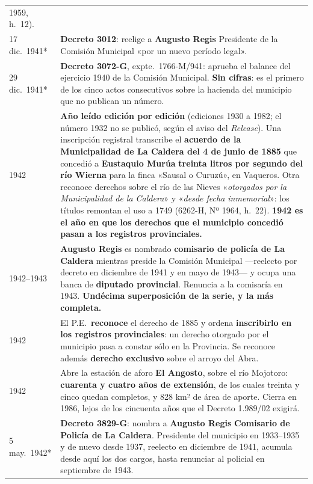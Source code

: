 \begin{longtable}{@{}p{2.7cm}p{10.3cm}@{}}
1959, h.\ 12). \\
17 dic.\ 1941* & \textbf{Decreto 3012}: reelige a \textbf{Augusto Regis}\index{Regis, Augusto} Presidente de la Comisión Municipal «por un nuevo período legal». \\
29 dic.\ 1941* & \textbf{Decreto 3072-G}, expte.\ 1766-M/941: aprueba el balance del ejercicio 1940 de la Comisión Municipal. \textbf{Sin cifras}: es el primero de los cinco actos consecutivos sobre la hacienda del municipio que no publican un número. \\
1942 & \textbf{Año leído edición por edición} (ediciones 1930 a 1982; el número 1932 no se publicó, según el aviso del \textit{Release}). Una inscripción registral transcribe el \textbf{acuerdo de la Municipalidad de La Caldera del 4 de junio de 1885} que concedió a \textbf{Eustaquio Murúa}\index{Murúa, Eustaquio} \textbf{treinta litros por segundo del río Wierna} para la finca «Sausal o Curuzú», en Vaqueros. Otra reconoce derechos sobre el río de las Nieves «\textit{otorgados por la Municipalidad de la Caldera}» y «\textit{desde fecha inmemorial}»: los títulos remontan el uso a 1749 (6262-H, Nº 1964, h.\ 22). \textbf{1942 es el año en que los derechos que el municipio concedió pasan a los registros provinciales.} \\
1942--1943 & \textbf{Augusto Regis}\index{Regis, Augusto} es nombrado \textbf{comisario de policía de La Caldera} mientras preside la Comisión Municipal ---reelecto por decreto en diciembre de 1941 y en mayo de 1943--- y ocupa una banca de \textbf{diputado provincial}. Renuncia a la comisaría en 1943. \textbf{Undécima superposición de la serie, y la más completa.} \\
1942 & El P.E.\ \textbf{reconoce} el derecho de 1885 y ordena \textbf{inscribirlo en los registros provinciales}: un derecho otorgado por el municipio pasa a constar sólo en la Provincia. Se reconoce además \textbf{derecho exclusivo} sobre el arroyo del Abra. \\
1942 & Abre la estación de aforo \textbf{El Angosto}, sobre el río Mojotoro: \textbf{cuarenta y cuatro años de extensión}, de los cuales treinta y cinco quedan completos, y 828 km² de área de aporte. Cierra en 1986, lejos de los cincuenta años que el Decreto 1.989/02 exigirá. \\
5 may.\ 1942* & \textbf{Decreto 3829-G}: nombra a \textbf{Augusto Regis}\index{Regis, Augusto} \textbf{Comisario de Policía de La Caldera}. Presidente del municipio en 1933--1935 y de nuevo desde 1937, reelecto en diciembre de 1941, acumula desde aquí los dos cargos, hasta renunciar al policial en septiembre de 1943. \\

\end{longtable}
